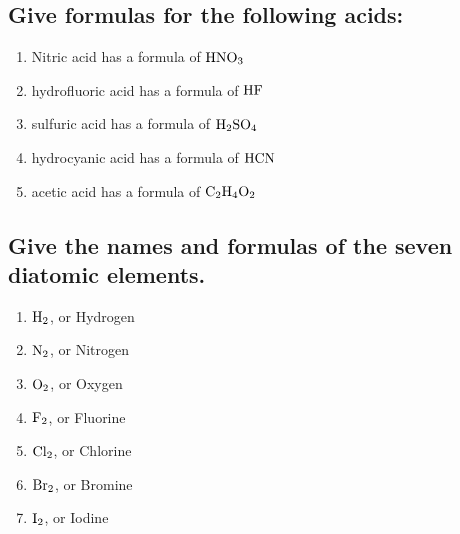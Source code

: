 \documentclass[11pt]{article}
\begin{document}
\subsection{Give formulas for the following acids:}
\label{sec:org7314bba}
\begin{enumerate}
\item Nitric acid has a formula of \(\ce{HNO3}\)
\item hydrofluoric acid has a formula of \(\ce{HF}\)
\item sulfuric acid has a formula of \(\ce{H2SO4}\)
\item hydrocyanic acid has a formula of \(\ce{HCN}\)
\item acetic acid has a formula of \(\ce{C2H4O2}\)
\end{enumerate}

\subsection{Give the names and formulas of the seven diatomic elements.}
\label{sec:org5333144}
\begin{enumerate}
\item \(\ce{H2}\), or Hydrogen
\item \(\ce{N2}\), or Nitrogen
\item \(\ce{O2}\), or Oxygen
\item \(\ce{F2}\), or Fluorine
\item \(\ce{Cl2}\), or Chlorine
\item \(\ce{Br2}\), or Bromine
\item \(\ce{I2}\), or Iodine
\end{enumerate}
\end{document}
